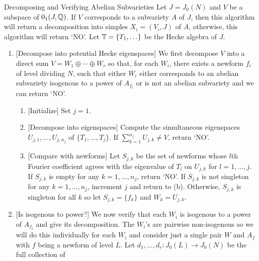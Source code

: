 \documentclass[11pt, proquest]{uwthesis}
\begin{document}
\begin{algorithm}{Decomposing and Verifying Abelian Subvarieties}
    \label{alg:decomp_and_verify_subvarieties}
    Let $J=J_0(N)$ and $V$ be a subspace of $0_1(J, \mathbb{Q})$. If $V$ corresponds
    to a subvariety $A$ of $J$, then this algorithm will return a decomposition
    into simples $X_i=(V_i, J)$ of $A$, otherwise, this algorithm will return
    `NO'. Let $\mathbb{T}=\{T_1,\ldots\}$ be the Hecke algebra of $J$.
    \begin{enumerate}
        \item{} [Decompose into potential Hecke eigenspaces]
            We first decompose $V$ into a direct sum $V=W_1\oplus \cdots \oplus
            W_r$ so that, for each $W_i$, there exists a newform $f_i$ of level
            dividing $N$, such that either $W_i$ either corresponds to an
            abelian subvariety isogenous to a power of $A_{f_i}$ or is not an
            abelian subvariety and we can return `NO'.
            \begin{enumerate}
                \item{} [Initialize]
                    Set $j=1$.
                \item{} [Decompose into eigenspaces]
                    Compute the simultaneous eigenspaces $U_{j,1},\ldots,U_{j,
                    n_j}$ of $\{T_1,\ldots,T_j\}$. If $\sum_{k=1} ^{n_j}
                    U_{j, k}\neq V$, return `NO'.
                \item{} [Compare with newforms]
                    Let $S_{j,k}$ be the set of newforms whose $l$th Fourier
                    coefficient agrees with the eigenvalue of $T_l$ on $U_{j,
                    k}$ for $l=1,\ldots,j$. If $S_{j, k}$ is empty for any
                    $k=1,\ldots,n_j$, return `NO'. If $S_{j,k}$ is not
                    singleton for any $k=1,\ldots, n_j$, increment $j$ and
                    return to (b). Otherwise, $S_{j,k}$ is singleton for all
                    $k$ so let $S_{j,k}=\{f_k\}$ and $W_k=U_{j,k}$.
            \end{enumerate}
        \item{} [Is isogenous to power?]
            We now verify that each $W_i$ is isogenous to a power of $A_{f_i}$
            and give its decomposition. The $W_i$'s are pairwise non-isogenous
            so we will do this individually for each $W_i$ and consider just a
            single pair $W$ and $A_f$ with $f$ being a newform of level $L$.
            Let $d_1,\ldots,d_r:J_0(L)\to J_0(N)$ be the full collection of

\end{enumerate}
\end{algorithm}
\end{document}
